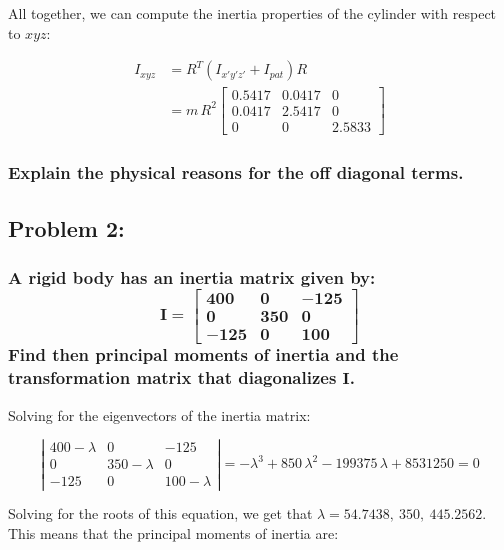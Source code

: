 \documentclass[12pt, letterpaper]{../assignment}
\begin{document}
All together, we can compute the inertia properties of the cylinder with respect to $xyz$:

\begin{answer}
\begin{equation*}
\begin{aligned}
    I_{xyz} &= R^T \left(I_{x'y'z'}+I_{pat}\right) R \\
    &= m\,R^2\left[\begin{array}{ccc} 0.5417 & 0.0417 & 0\\
    0.0417 & 2.5417 & 0\\
    0 & 0 & 2.5833 \end{array}\right]
\end{aligned}
\end{equation*}
\end{answer}

\subsubsection*{Explain the physical reasons for the off diagonal terms.}

\subsection*{Problem 2:}
\subsubsection*{A rigid body has an inertia matrix given by:
$$ \bm{I = } \left[\begin{array}{ccc}
    \bm{400} & \bm{0} & \bm{-125} \\
    \bm{0} & \bm{350} & \bm{0} \\
    \bm{-125} & \bm{0} & \bm{100}
\end{array}\right] $$
Find then principal moments of inertia and the transformation matrix that diagonalizes $\bm{I}$.}

Solving for the eigenvectors of the inertia matrix:

$$ \left|\begin{array}{ccc} 400-\lambda  & 0 & -125\\ 0 & 350-\lambda  & 0\\ -125 & 0 & 100-\lambda  \end{array}\right| = -\lambda ^3+850\,\lambda ^2-199375\,\lambda +8531250 = 0 $$

Solving for the roots of this equation, we get that $\lambda =  54.7438,\ 350,\ 445.2562$. 
This means that the principal moments of inertia are:
\end{document}

